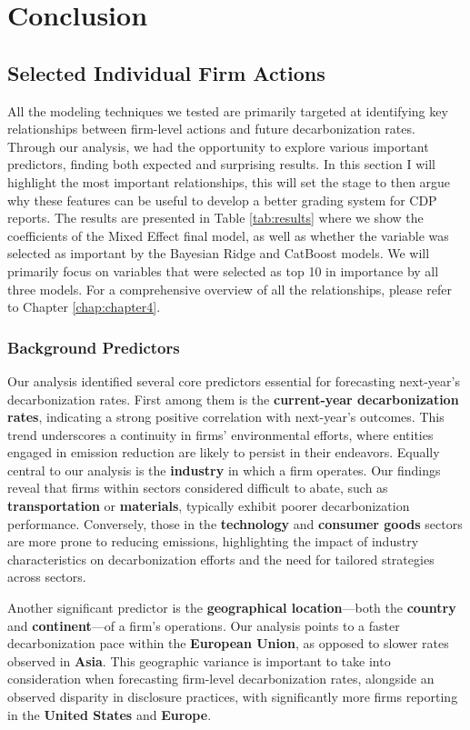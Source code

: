 \chapter{Conclusion}
\label{chap:conclusion}

\section{Selected Individual Firm Actions}
All the modeling techniques we tested are primarily targeted at identifying key relationships between firm-level actions and future decarbonization rates. Through our analysis, we had the opportunity to explore various important predictors, finding both expected and surprising results. In this section I will highlight the most important relationships, this will set the stage to then argue why these features can be useful to develop a better grading system for CDP reports. The results are presented in Table \ref{tab:results} where we show the coefficients of the Mixed Effect final model, as well as whether the variable was selected as important by the Bayesian Ridge and CatBoost models. We will primarily focus on variables that were selected as top 10 in importance by all three models. For a comprehensive overview of all the relationships, please refer to Chapter \ref{chap:chapter4}.


\subsection{Background Predictors}
Our analysis identified several core predictors essential for forecasting next-year's decarbonization rates. First among them is the \textbf{current-year decarbonization rates}, indicating a strong positive correlation with next-year's outcomes. This trend underscores a continuity in firms' environmental efforts, where entities engaged in emission reduction are likely to persist in their endeavors. Equally central to our analysis is the \textbf{industry} in which a firm operates. Our findings reveal that firms within sectors considered difficult to abate, such as \textbf{transportation} or \textbf{materials}, typically exhibit poorer decarbonization performance. Conversely, those in the \textbf{technology} and \textbf{consumer goods} sectors are more prone to reducing emissions, highlighting the impact of industry characteristics on decarbonization efforts and the need for tailored strategies across sectors.

Another significant predictor is the \textbf{geographical location}—both the \textbf{country} and \textbf{continent}—of a firm's operations. Our analysis points to a faster decarbonization pace within the \textbf{European Union}, as opposed to slower rates observed in \textbf{Asia}. This geographic variance is important to take into consideration when forecasting firm-level decarbonization rates, alongside an observed disparity in disclosure practices, with significantly more firms reporting in the \textbf{United States} and \textbf{Europe}.

